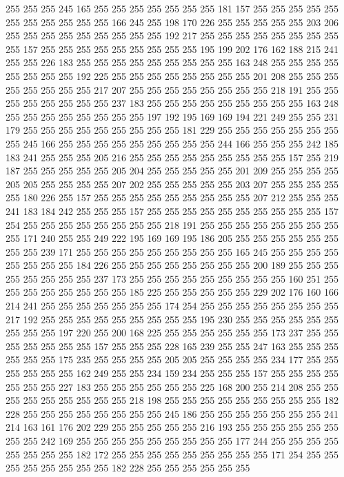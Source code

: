 255 255 255 245 165 255 255 255 255 255 255 255 181 157 255 255 255 255 255 255
255 255 255 255 255 166 245 255 198 170 226 255 255 255 255 255 203 206 255 255
255 255 255 255 255 255 255 192 217 255 255 255 255 255 255 255 255 255 157 255
255 255 255 255 255 255 255 255 195 199 202 176 162 188 215 241 255 255 226 183
255 255 255 255 255 255 255 255 255 163 248 255 255 255 255 255 255 255 255 192
225 255 255 255 255 255 255 255 255 201 208 255 255 255 255 255 255 255 255 217
207 255 255 255 255 255 255 255 255 218 191 255 255 255 255 255 255 255 255 237
183 255 255 255 255 255 255 255 255 255 163 248 255 255 255 255 255 255 255 255
197 192 195 169 169 194 221 249 255 255 231 179 255 255 255 255 255 255 255 255
255 181 229 255 255 255 255 255 255 255 255 245 166 255 255 255 255 255 255 255
255 255 244 166 255 255 255 242 185 183 241 255 255 255 205 216 255 255 255 255
255 255 255 255 255 157 255 219 187 255 255 255 255 255 205 204 255 255 255 255
255 201 209 255 255 255 255 205 205 255 255 255 255 207 202 255 255 255 255 255
203 207 255 255 255 255 255 180 226 255 157 255 255 255 255 255 255 255 255 255
207 212 255 255 255 241 183 184 242 255 255 255 157 255 255 255 255 255 255 255
255 255 255 157 254 255 255 255 255 255 255 255 255 218 191 255 255 255 255 255
255 255 255 255 171 240 255 255 249 222 195 169 169 195 186 205 255 255 255 255
255 255 255 255 239 171 255 255 255 255 255 255 255 255 255 165 245 255 255 255
255 255 255 255 255 184 226 255 255 255 255 255 255 255 255 200 189 255 255 255
255 255 255 255 255 237 173 255 255 255 255 255 255 255 255 255 160 251 255 255
255 255 255 255 255 255 185 225 255 255 255 255 255 229 202 176 160 166 214 241
255 255 255 255 255 255 255 174 254 255 255 255 255 255 255 255 255 217 192 255
255 255 255 255 255 255 255 255 195 230 255 255 255 255 255 255 255 255 255 197
220 255 200 168 225 255 255 255 255 255 255 173 237 255 255 255 255 255 255 255
157 255 255 255 228 165 239 255 255 247 163 255 255 255 255 255 255 175 235 255
255 255 255 205 205 255 255 255 255 234 177 255 255 255 255 255 255 162 249 255
255 234 159 234 255 255 255 157 255 255 255 255 255 255 255 227 183 255 255 255
255 255 255 225 168 200 255 214 208 255 255 255 255 255 255 255 255 255 218 198
255 255 255 255 255 255 255 255 255 182 228 255 255 255 255 255 255 255 255 245
186 255 255 255 255 255 255 255 241 214 163 161 176 202 229 255 255 255 255 255
216 193 255 255 255 255 255 255 255 255 242 169 255 255 255 255 255 255 255 255
255 177 244 255 255 255 255 255 255 255 255 182 172 255 255 255 255 255 255 255
255 255 171 254 255 255 255 255 255 255 255 255 182 228 255 255 255 255 255 255
